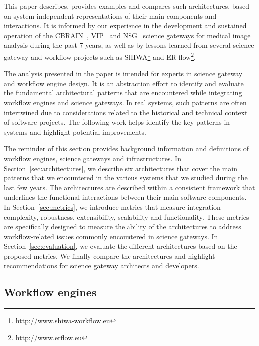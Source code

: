 \documentclass[preprint,3p,twocolumn]{elsarticle}
\newcommand{\correction}[1]{\color{blue}#1\color{black}\xspace}
\begin{document}
This paper describes, provides examples and compares such
architectures, based on system-independent representations of their
main components and interactions. It is informed by our experience in
the development and sustained operation of the CBRAIN~\cite{SHER-14},
VIP~\cite{GLAT-13} and NSG~\cite{shahand2015data,shahand:2012jgc}
science gateways for medical image analysis during the past 7 years,
as well as by lessons learned from several science gateway and
workflow projects such as
SHIWA\footnote{\url{http://www.shiwa-workflow.eu}} and
ER-flow\footnote{\url{http://www.erflow.eu}}.

\correction{The analysis presented in the paper is intended for
experts in science gateway and workflow engine design. It is an
abstraction effort to identify and evaluate the fundamental
architectural patterns that are encountered while integrating workflow
engines and science gateways. In real systems, such patterns are often
intertwined due to considerations related to the historical and
technical context of software projects. The following work helps
identify the key patterns in systems and highlight potential
improvements.}

\correction{The reminder of this section provides} background
information and definitions of workflow engines, science gateways and
infrastructures. In Section~\ref{sec:architectures}, we describe six
architectures that cover the main patterns that we encountered in the
various systems that we studied during the last few years. The
architectures are described within a consistent framework that
underlines the functional interactions between their main software
components. \correction{In Section~\ref{sec:metrics}, we introduce
  metrics that measure integration complexity, robustness,
  extensibility, scalability and \correction{functionality}. These
  metrics are specifically designed to measure the ability of the
  architectures to address workflow-related issues commonly
  encountered in science gateways. In Section~\ref{sec:evaluation}, we
  evaluate the different architectures based on the proposed metrics.}
We finally compare the architectures and highlight recommendations for
science gateway architects and developers.

\subsection{Workflow engines}
\end{document}

